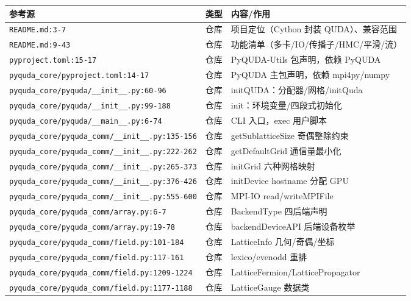 \documentclass[UTF8]{ctexart}
\begin{document}
\begin{xltabular}{\textwidth}{llX}
\toprule
\textcolor{evidence}{参考源} & 类型 & 内容/作用 \\
\midrule
\endhead
\texttt{\nolinkurl{README.md:3-7}} & 仓库 & 项目定位（Cython 封装 QUDA）、兼容范围 \\
\texttt{\nolinkurl{README.md:9-43}} & 仓库 & 功能清单（多卡/IO/传播子/HMC/平滑/流） \\
\texttt{\nolinkurl{pyproject.toml:15-17}} & 仓库 & PyQUDA-Utils 包声明，依赖 PyQUDA \\
\texttt{\nolinkurl{pyquda_core/pyproject.toml:14-17}} & 仓库 & PyQUDA 主包声明，依赖 mpi4py/numpy \\
\texttt{\nolinkurl{pyquda_core/pyquda/__init__.py:60-96}} & 仓库 & initQUDA：分配器/网格/initQuda \\
\texttt{\nolinkurl{pyquda_core/pyquda/__init__.py:99-188}} & 仓库 & init：环境变量/四段式初始化 \\
\texttt{\nolinkurl{pyquda_core/pyquda/__main__.py:6-74}} & 仓库 & CLI 入口，exec 用户脚本 \\
\texttt{\nolinkurl{pyquda_core/pyquda_comm/__init__.py:135-156}} & 仓库 & getSublatticeSize 奇偶整除约束 \\
\texttt{\nolinkurl{pyquda_core/pyquda_comm/__init__.py:222-262}} & 仓库 & getDefaultGrid 通信量最小化 \\
\texttt{\nolinkurl{pyquda_core/pyquda_comm/__init__.py:265-373}} & 仓库 & initGrid 六种网格映射 \\
\texttt{\nolinkurl{pyquda_core/pyquda_comm/__init__.py:376-426}} & 仓库 & initDevice hostname 分配 GPU \\
\texttt{\nolinkurl{pyquda_core/pyquda_comm/__init__.py:555-600}} & 仓库 & MPI-IO read/writeMPIFile \\
\texttt{\nolinkurl{pyquda_core/pyquda_comm/array.py:6-7}} & 仓库 & BackendType 四后端声明 \\
\texttt{\nolinkurl{pyquda_core/pyquda_comm/array.py:19-78}} & 仓库 & backendDeviceAPI 后端设备枚举 \\
\texttt{\nolinkurl{pyquda_core/pyquda_comm/field.py:101-184}} & 仓库 & LatticeInfo 几何/奇偶/坐标 \\
\texttt{\nolinkurl{pyquda_core/pyquda_comm/field.py:117-161}} & 仓库 & lexico/evenodd 重排 \\
\texttt{\nolinkurl{pyquda_core/pyquda_comm/field.py:1209-1224}} & 仓库 & LatticeFermion/LatticePropagator \\
\texttt{\nolinkurl{pyquda_core/pyquda_comm/field.py:1177-1188}} & 仓库 & LatticeGauge 数据类 \\

\end{xltabular}
\end{document}
